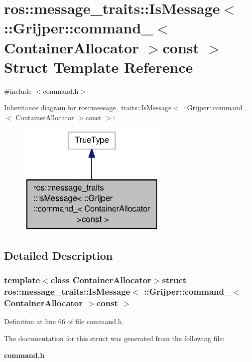 \section{ros\-:\-:message\-\_\-traits\-:\-:Is\-Message$<$ \-:\-:Grijper\-:\-:command\-\_\-$<$ Container\-Allocator $>$const $>$ Struct Template Reference}
\label{structros_1_1message__traits_1_1IsMessage_3_01_1_1Grijper_1_1command___3_01ContainerAllocator_01_4const_01_01_4}


{\ttfamily \#include $<$command.\-h$>$}



Inheritance diagram for ros\-:\-:message\-\_\-traits\-:\-:Is\-Message$<$ \-:\-:Grijper\-:\-:command\-\_\-$<$ Container\-Allocator $>$const $>$\-:\nopagebreak
\begin{figure}[H]
\begin{center}
\leavevmode
\includegraphics[width=204pt]{structros_1_1message__traits_1_1IsMessage_3_01_1_1Grijper_1_1command___3_01ContainerAllocator_01_4const_01_01_4__inherit__graph}
\end{center}
\end{figure}


\subsection{Detailed Description}
\subsubsection*{template$<$class Container\-Allocator$>$struct ros\-::message\-\_\-traits\-::\-Is\-Message$<$ \-::\-Grijper\-::command\-\_\-$<$ Container\-Allocator $>$const  $>$}



Definition at line 66 of file command.\-h.



The documentation for this struct was generated from the following file\-:\begin{DoxyCompactItemize}
\item 
{\bf command.\-h}\end{DoxyCompactItemize}
